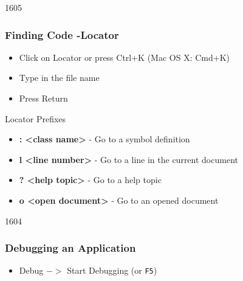\begin{slide}{1605}
  \frametitle{Finding Code -Locator}
 \begin{itemize}
  \item Click on Locator or press Ctrl+K (Mac OS X: Cmd+K)
 \item Type in the file name
 \item Press Return
 \end{itemize}
 \newline
 Locator Prefixes
 \begin{itemize}
 \item \textbf{: <class name>} - Go to a symbol definition
 \item \textbf{l <line number> } - Go to a line in the current document
 \item \textbf{? <help topic>} - Go to a help topic
 \item \textbf{o <open document>} - Go to an opened document
 \end{itemize}
\end{slide}

\begin{slide}{1604}
  \frametitle{Debugging an Application}
  \begin{itemize}
  \item Debug $->$ Start Debugging (or \texttt{F5})
  \end{itemize}
\end{slide}


